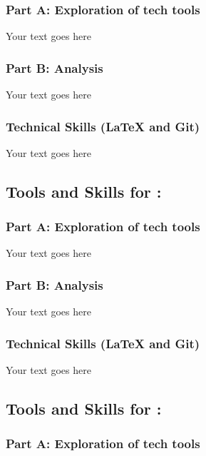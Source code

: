 \documentclass[a4paper, 11pt]{report}
\begin{document}
\subsubsection{Part A: Exploration of tech tools}

Your text goes here

\subsubsection{Part B: Analysis}

Your text goes here

\subsubsection{Technical Skills (LaTeX and Git)}

Your text goes here



\subsection{Tools and Skills for \majB: \studB}

\subsubsection{Part A: Exploration of tech tools}

Your text goes here

\subsubsection{Part B: Analysis}

Your text goes here

\subsubsection{Technical Skills (LaTeX and Git)}

Your text goes here


\subsection{Tools and Skills for \majC: \studC}

\subsubsection{Part A: Exploration of tech tools}
\end{document}
